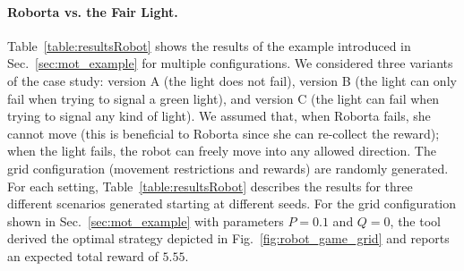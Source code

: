 \paragraph{Roborta vs. the Fair Light.}  Table~\ref{table:resultsRobot} shows the results of the example introduced in Sec.~\ref{sec:mot_example} 
for multiple configurations. 
We considered three variants of the case study: version A (the light does not fail), version B (the light can only fail when trying to signal a green light), and version C (the light can fail when trying to signal any kind of light). 
We assumed that, when Roborta  fails,  she cannot move (this is beneficial to Roborta since she can re-collect the reward);
when the light fails, the robot can freely move into any allowed direction. 
The grid configuration (movement restrictions and rewards) are randomly generated.  For each setting, Table~\ref{table:resultsRobot} describes the results for three different scenarios generated starting at different seeds.  For the grid configuration shown in Sec.~\ref{sec:mot_example} with  parameters $P=0.1$ and $Q=0$, the tool derived the optimal strategy depicted in Fig.~\ref{fig:robot_game_grid} and reports an expected total reward of $5.55$. 



